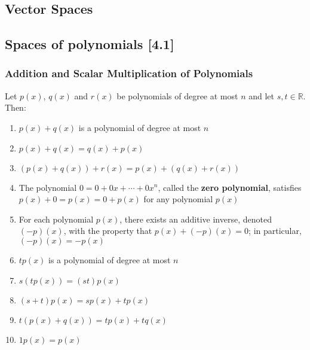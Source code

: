 \documentclass[a4paper,9pt]{extarticle}
\begin{document}
\begin{multicols*}{2}






\section{Vector Spaces}

\subsection{Spaces of polynomials [4.1]}

\subsubsection{Addition and Scalar Multiplication of Polynomials}

Let $p(x)$, $q(x)$ and $r(x)$ be polynomials of degree at most $n$ and let $s, t \in \mathbb{R}$. Then:
\begin{enumerate}[label=\bfseries (\arabic*)] \itemsep0pt \parskip0pt 
    \item $p(x) + q(x)$ is a polynomial of degree at most $n$
    \item $p(x) + q(x) = q(x) + p(x)$
    \item $(p(x) + q(x)) + r(x) = p(x) + (q(x) + r(x))$
    \item The polynomial $0 = 0 + 0x + \cdots + 0x^n$, called the \textbf{zero polynomial}, satisfies $p(x) + 0 = p(x) = 0 + p(x)$ for any polynomial $p(x)$
    \item For each polynomial $p(x)$, there exists an additive inverse, denoted $(-p)(x)$, with the property that $p(x) + (-p)(x) = 0$; in particular, $(-p)(x) = -p(x)$
    \item $t p(x)$ is a polynomial of degree at most $n$
    \item $s(tp(x)) = (st)p(x)$
    \item $(s + t)p(x) = s p(x) + t p(x)$
    \item $t(p(x) + q(x)) = t p(x) + t q(x)$
    \item $1 p(x) = p(x)$
\end{enumerate}


\end{multicols*}
\end{document}
